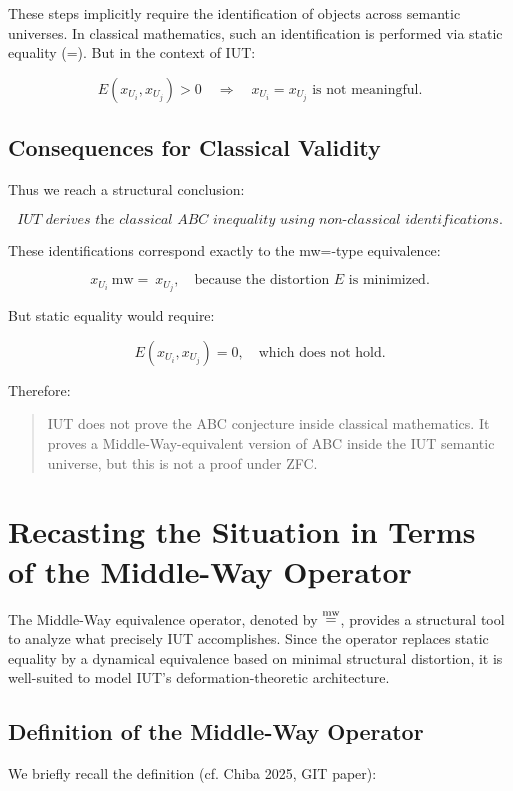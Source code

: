 \documentclass[11pt]{article}
\begin{document}
These steps implicitly require the identification of objects across
semantic universes. In classical mathematics, such an identification is
performed via static equality (=). But in the context of IUT:

\[
E(x_{U_i}, x_{U_j}) > 0 \quad \Rightarrow \quad x_{U_i} = x_{U_j}
\text{ is not meaningful.}
\]

\subsection{Consequences for Classical Validity}

Thus we reach a structural conclusion:

\[
\textit{IUT derives the classical ABC inequality using non-classical
identifications.}
\]

These identifications correspond exactly to the mw=-type equivalence:

\[
x_{U_i} \ \mathrm{mw=} \ x_{U_j},
\quad\text{because the distortion } E \text{ is minimized.}
\]

But static equality would require:

\[
E(x_{U_i}, x_{U_j}) = 0,
\quad \text{which does not hold.}
\]

Therefore:

\begin{quote}
IUT does not prove the ABC conjecture inside classical mathematics.  
It proves a Middle-Way-equivalent version of ABC inside the IUT semantic
universe, but this is not a proof under ZFC.
\end{quote}


\section{Recasting the Situation in Terms of the Middle-Way Operator}

The Middle-Way equivalence operator, denoted by $\mathrel{\overset{\mathrm{mw}}{=}}$, provides a
structural tool to analyze what precisely IUT accomplishes. Since the
operator replaces static equality by a dynamical equivalence based on
minimal structural distortion, it is well-suited to model IUT's
deformation-theoretic architecture.

\subsection{Definition of the Middle-Way Operator}

We briefly recall the definition (cf. Chiba 2025, GIT paper):
\end{document}
